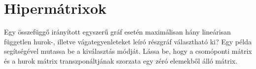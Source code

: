 \documentclass[../main.tex]{subfiles}
\begin{document}
\section{Hipermátrixok}

\begin{fulltheorem}
	Egy összefüggő irányított egyszerű gráf esetén maximálisan hány lineárisan
	független hurok-, illetve vágategyenleteket leíró részgráf választható ki?
	Egy példa segítségével mutassa be a kiválasztás módját. Lássa be, hogy a
	csomóponti mátrix és a hurok mátrix transzponáltjának szorzata egy zéró
	elemekből álló mátrix.
\end{fulltheorem}
\end{document}
